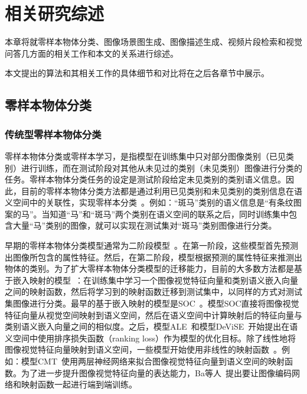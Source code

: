 \chapter{相关研究综述}

本章将就零样本物体分类、图像场景图生成、图像描述生成、视频片段检索和视觉问答几方面的相关工作和本文的关系进行综述。

本文提出的算法和其相关工作的具体细节和对比将在之后各章节中展示。


\section{零样本物体分类}

\subsection{传统型零样本物体分类}
零样本物体分类或零样本学习，是指模型在训练集中只对部分图像类别（已见类别）进行训练，而在测试阶段对其他从未见过的类别（未见类别）图像进行分类的任务。零样本物体分类任务的设定是测试阶段给定未见类别的类别语义信息。因此，目前的零样本物体分类方法都是通过利用已见类别和未见类别的类别信息在语义空间中的关联性，实现零样本分类~\cite{farhadi2009describing,lampert2009learning,romera2015embarrassingly,norouzi2014zero,demirel2017attributes2classname,jiang2017learning}。例如：“斑马”类别的语义信息是“有条纹图案的马”。当知道“马”和“斑马”两个类别在语义空间的联系之后，同时训练集中包含大量“马”类别的图像，就可以实现在测试集对“斑马”类别图像进行分类。

早期的零样本物体分类模型通常为二阶段模型~\cite{lampert2013attribute,norouzi2014zero,al2016recovering,jayaraman2014zero,kankuekul2012online}。在第一阶段，这些模型首先预测出图像所包含的属性特征。然后，在第二阶段，模型根据预测的属性特征来推测出物体的类别。为了扩大零样本物体分类模型的迁移能力，目前的大多数方法都是基于嵌入映射的模型~\cite{palatucci2009zero,frome2013devise,akata2015label,akata2015evaluation,romera2015embarrassingly,xian2016latent,socher2013zero,kodirov2017semantic,li2017zero}：在训练集中学习一个图像视觉特征向量和类别语义嵌入向量之间的映射函数，然后将学习到的映射函数迁移到测试集中，以同样的方式对测试集图像进行分类。最早的基于嵌入映射的模型是SOC~\cite{palatucci2009zero}。模型SOC直接将图像视觉特征向量从视觉空间映射到语义空间，然后在语义空间中计算映射后的特征向量与类别语义嵌入向量之间的相似度。之后，模型ALE~\cite{akata2015label}和模型DeViSE~\cite{frome2013devise}开始提出在语义空间中使用排序损失函数（ranking loss）作为模型的优化目标。除了线性地将图像视觉特征向量映射到语义空间，一些模型开始使用非线性的映射函数~\cite{xian2016latent}。例如：模型CMT~\cite{socher2013zero}使用两层神经网络来拟合图像视觉特征向量到语义空间的映射函数。为了进一步提升图像视觉特征向量的表达能力，Ba等人~\cite{lei2015predicting}提出要让图像编码网络和映射函数一起进行端到端训练。

